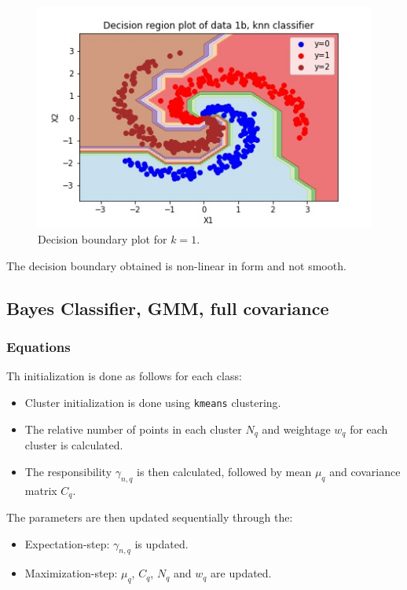 \documentclass[11pt,a4paper]{article}
\newcommand{\noi}{\noindent}
\def\tt#1{\texttt{#1}}
\begin{document}
\begin{figure}[H]
    \centering
    \includegraphics[scale=1]{images/1b_KNN_decision_region.jpg}
    \caption{Decision boundary plot for $k=1$.}
    \label{fig:1b_decreg_KNN}
\end{figure}

\noi
The decision boundary obtained is non-linear in form and not smooth. 

\break
\subsection{Bayes Classifier, GMM, full covariance}
\subsubsection{Equations}
Th initialization is done as follows for each class:
\begin{itemize}
    \itemsep0em
    \item Cluster initialization is done using \tt{kmeans} clustering.
    \item The relative number of points in each cluster $N_q$ and weightage $w_q$ for each cluster is calculated.
    \item The responsibility $\gamma_{n,q}$ is then calculated, followed by mean $\mu_q$ and covariance matrix $C_q$.
\end{itemize}

\noi
The parameters are then updated sequentially through the:
\begin{itemize}
    \itemsep0em
    \item Expectation-step: $\gamma_{n,q}$ is updated.
    \item Maximization-step: $\mu_q$, $C_q$, $N_q$ and $w_q$ are updated.
\end{itemize}
\end{document}
